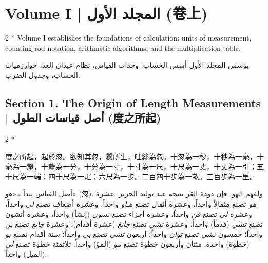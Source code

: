 \documentclass[11pt,a4paper]{article}
\newcommand{\ar}[1]{\arabicfont\beginR #1\endR}
\newcommand{\zh}[1]{{\CJKfamily{}#1}}
\begin{document}
\newpage

\section{Volume I | \ar{المجلد الأول} (\zh{卷上})}

\begin{paracol}{2}
\switchcolumn[0]*\noindent
Volume I establishes the foundations of calculation: units of measurement, counting rod notation, arithmetic algorithms, and the multiplication table.

\switchcolumn
\noindent
\ar{يؤسس المجلد الأول أسس الحساب: وحدات القياس، نظام عيدان العد، خوارزميات الحساب، وجدول الضرب.}
\end{paracol}

\subsection*{Section 1. The Origin of Length Measurements | \ar{أصل قياسات الطول} (\zh{度之所起})}

\begin{paracol}{2}
\switchcolumn[0]*\noindent
\begin{tcolorbox}[colback=chinesebg,colframe=rulecolor,boxrule=0.5pt,left=6pt,right=6pt,top=4pt,bottom=4pt]
\zh{度之所起，起於忽。欲知其忽，蠶所生，吐絲為忽。十忽為一秒，十秒為一毫，十毫為一釐，十釐為一分，十分為一寸，十寸為一尺，十尺為一丈，十丈為一引；五十尺為一端；四十尺為一疋；六尺為一步。二百四十步為一畝。三百步為一里。}
\end{tcolorbox}

\switchcolumn
\begin{tcolorbox}[colback=arabicbg,colframe=rulecolor!70!green,boxrule=0.5pt,left=6pt,right=6pt,top=4pt,bottom=4pt]
\arabicfont\raggedleft
أصل القياس يبدأ بـ«هو» (\zh{忽}). ولفهم الهو، فإن دودة القز تنتجه عند توليد الحرير. عشرة \textit{هو} تصنع مِثقالاً واحداً، وعشرة أثقال تصنع \textit{هـاو} واحداً، وعشرة أضعاف تصنع \textit{لي} واحداً، وعشرة \textit{لي} تصنع \textit{فن} واحداً، وعشرة أجزاء تصنع \textit{تسون} (إنشاً) واحداً، وعشرة أتشون تصنع \textit{تشي} (قدماً) واحداً، وعشرة \textit{تشي} تصنع \textit{جانغ} (عشرة أقدام)، وعشرة \textit{جانغ} تصنع \textit{ين} واحداً؛ خمسون \textit{تشي} تصنع \textit{توان} واحداً؛ أربعون \textit{تشي} تصنع \textit{بي} واحداً؛ ستة أقدام تصنع \textit{بو} (خطوة) واحدة. مئتان وأربعون خطوة تصنع \textit{مو} (المؤ) واحداً. ثلاثمئة خطوة تصنع \textit{لي} (الميل) واحداً.
\end{tcolorbox}
\end{paracol}
\end{document}
